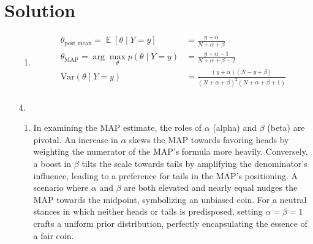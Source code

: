 \documentclass[submit]{harvardml}
\newenvironment{answer}
  {\section*{Solution}}
{}
\DeclareMathOperator*{\mean}{\mathbb{E}}
\begin{document}
\begin{answer}
\begin{enumerate}
\begin{enumerate}
        \item
              \begin{align*}
                \theta_{\text{post mean}} = \mean [\theta \mid Y = y]     & = \frac{y + \alpha}{N + \alpha + \beta}  \\
                \theta_{\text{MAP}} =\arg \max_{\theta}p(\theta \mid Y=y) & = \frac{y + \alpha - 1}{N + \alpha + \beta - 2} \\
                \mathrm{Var}(\theta \mid Y = y)                           & =  \frac{(y + \alpha) (N - y + \beta)}{(N + \alpha + \beta)^2 (N + \alpha + \beta + 1)} \\
              \end{align*}

      \end{enumerate}

    \item[4.]

      \begin{enumerate}
        \item In examining the MAP estimate, the roles of \(\alpha\) (alpha) and \(\beta\) (beta) are pivotal. An increase in \(\alpha\) skews the MAP towards favoring heads by weighting the numerator of the MAP's formula more heavily. Conversely, a boost in \(\beta\) tilts the scale towards tails by amplifying the denominator's influence, leading to a preference for tails in the MAP's positioning. A scenario where \(\alpha\) and \(\beta\) are both elevated and nearly equal nudges the MAP towards the midpoint, symbolizing an unbiased coin. For a neutral stances in which neither heads or tails is predisposed, setting \(\alpha = \beta = 1\) crafts a uniform prior distribution, perfectly encapsulating the essence of a fair coin.



\end{enumerate}
\end{enumerate}
\end{answer}
\end{document}
